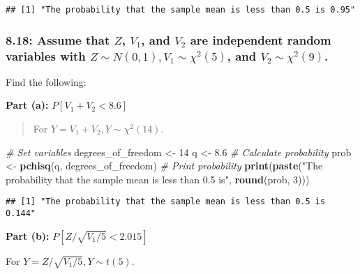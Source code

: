 \documentclass[
]{article}
\newenvironment{Shaded}{\begin{snugshade}}{\end{snugshade}}
\newcommand{\CommentTok}[1]{\textcolor[rgb]{0.56,0.35,0.01}{\textit{#1}}}
\newcommand{\DecValTok}[1]{\textcolor[rgb]{0.00,0.00,0.81}{#1}}
\newcommand{\FloatTok}[1]{\textcolor[rgb]{0.00,0.00,0.81}{#1}}
\newcommand{\FunctionTok}[1]{\textcolor[rgb]{0.13,0.29,0.53}{\textbf{#1}}}
\newcommand{\NormalTok}[1]{#1}
\newcommand{\OtherTok}[1]{\textcolor[rgb]{0.56,0.35,0.01}{#1}}
\newcommand{\StringTok}[1]{\textcolor[rgb]{0.31,0.60,0.02}{#1}}
\begin{document}
\begin{verbatim}
## [1] "The probability that the sample mean is less than 0.5 is 0.95"
\end{verbatim}

\hypertarget{assume-that-z-v_1-and-v_2-are-independent-random-variables-with-z-sim-n01-v_1-sim-chi25-and-v_2-sim-chi29.}{%
\subsubsection{\texorpdfstring{8.18: Assume that \(Z\), \(V_1\), and
\(V_2\) are independent random variables with
\(Z \sim N(0,1), V_1 \sim \chi^2(5)\), and
\(V_2 \sim \chi^2(9)\).}{8.18: Assume that Z, V\_1, and V\_2 are independent random variables with Z \textbackslash sim N(0,1), V\_1 \textbackslash sim \textbackslash chi\^{}2(5), and V\_2 \textbackslash sim \textbackslash chi\^{}2(9).}}\label{assume-that-z-v_1-and-v_2-are-independent-random-variables-with-z-sim-n01-v_1-sim-chi25-and-v_2-sim-chi29.}}

Find the following:

\textbf{Part (a):} \(P[V_1 + V_2 < 8.6]\)

\begin{quote}
For \(Y = V_1 + V_2, Y \sim \chi^2(14)\).
\end{quote}

\begin{Shaded}
\begin{Highlighting}[]
\CommentTok{\# Set variables}
\NormalTok{degrees\_of\_freedom }\OtherTok{\textless{}{-}} \DecValTok{14}
\NormalTok{q }\OtherTok{\textless{}{-}} \FloatTok{8.6}
\CommentTok{\# Calculate probability}
\NormalTok{prob }\OtherTok{\textless{}{-}} \FunctionTok{pchisq}\NormalTok{(q, degrees\_of\_freedom)}
\CommentTok{\# Print probability}
\FunctionTok{print}\NormalTok{(}\FunctionTok{paste}\NormalTok{(}\StringTok{"The probability that the sample mean is less than 0.5 is"}\NormalTok{, }\FunctionTok{round}\NormalTok{(prob, }\DecValTok{3}\NormalTok{)))}
\end{Highlighting}
\end{Shaded}

\begin{verbatim}
## [1] "The probability that the sample mean is less than 0.5 is 0.144"
\end{verbatim}

\textbf{Part (b):} \(P[Z/\sqrt{V_1/5} < 2.015]\)

For \(Y = Z/\sqrt{V_1/5}, Y \sim t(5)\).
\end{document}
